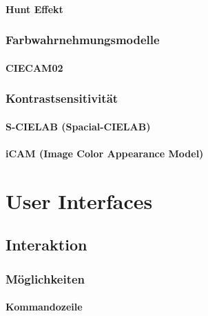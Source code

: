 \documentclass[a4paper, 11pt, accentcolor = tud3b]{tudreport}
\begin{document}
				\subsubsection{Hunt Effekt} %

			\subsection{Farbwahrnehmungsmodelle} %

				\subsubsection{CIECAM02} %

			\subsection{Kontrastsensitivität} %

				\subsubsection{S-CIELAB (Spacial-CIELAB)} %

				\subsubsection{iCAM (Image Color Appearance Model)} %

	\chapter{User Interfaces} %

		\section{Interaktion} %

			\subsection{Möglichkeiten} %

				\subsubsection{Kommandozeile} %
\end{document}
